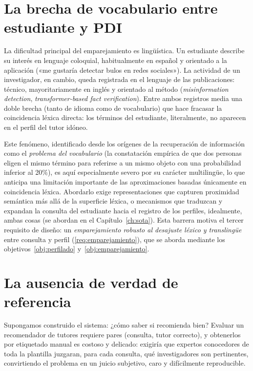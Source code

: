 \section{La brecha de vocabulario entre estudiante y PDI}
\label{sec:problema-vocabulario}

La dificultad principal del emparejamiento es lingüística.
Un estudiante describe su interés en lenguaje coloquial, habitualmente en español y orientado a la aplicación («me gustaría detectar bulos en redes sociales»).
La actividad de un investigador, en cambio, queda registrada en el lenguaje de las publicaciones: técnico, mayoritariamente en inglés y orientado al método (\emph{misinformation detection}, \emph{transformer-based fact verification}).
Entre ambos registros media una doble brecha (tanto de idioma como de vocabulario) que hace fracasar la coincidencia léxica directa: los términos del estudiante, literalmente, no aparecen en el perfil del tutor idóneo.

Este fenómeno, identificado desde los orígenes de la recuperación de información como el \emph{problema del vocabulario} \citep{furnas1987vocabulary} (la constatación empírica de que dos personas eligen el mismo término para referirse a un mismo objeto con una probabilidad inferior al 20\%), es aquí especialmente severo por su carácter multilingüe, lo que anticipa una limitación importante de las aproximaciones basadas únicamente en coincidencia léxica.
Abordarlo exige representaciones que capturen proximidad semántica más allá de la superficie léxica, o mecanismos que traduzcan y expandan la consulta del estudiante hacia el registro de los perfiles, idealmente, ambas cosas (se abordan en el Capítulo~\ref{ch:sota}).
Esta barrera motiva el tercer requisito de diseño: un \emph{emparejamiento robusto al desajuste léxico y translingüe} entre consulta y perfil (\ref{req:emparejamiento}), que se aborda mediante los objetivos~\ref{obj:perfilado} y~\ref{obj:emparejamiento}.

\section{La ausencia de verdad de referencia}
\label{sec:problema-groundtruth}

Supongamos construido el sistema: ¿cómo saber si recomienda bien? Evaluar un recomendador de tutores requiere pares (consulta, tutor correcto), y obtenerlos por etiquetado manual es costoso y delicado: exigiría que expertos conocedores de toda la plantilla juzgaran, para cada consulta, qué investigadores son pertinentes, convirtiendo el problema en un juicio subjetivo, caro y difícilmente reproducible.

